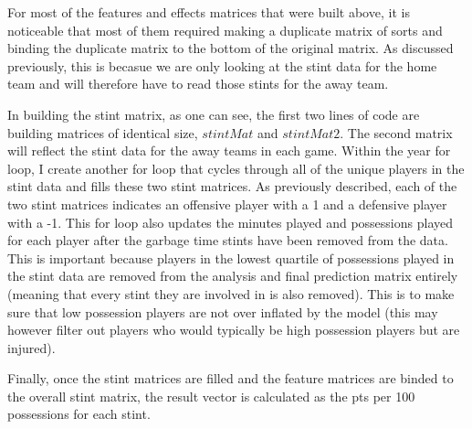 \documentclass[]{article}
\begin{document}
For most of the features and effects matrices that were built above, it
is noticeable that most of them required making a duplicate matrix of
sorts and binding the duplicate matrix to the bottom of the original
matrix. As discussed previously, this is becasue we are only looking at
the stint data for the home team and will therefore have to read those
stints for the away team.

In building the stint matrix, as one can see, the first two lines of
code are building matrices of identical size, \(stintMat\) and
\(stintMat2\). The second matrix will reflect the stint data for the
away teams in each game. Within the year for loop, I create another for
loop that cycles through all of the unique players in the stint data and
fills these two stint matrices. As previously described, each of the two
stint matrices indicates an offensive player with a 1 and a defensive
player with a -1. This for loop also updates the minutes played and
possessions played for each player after the garbage time stints have
been removed from the data. This is important because players in the
lowest quartile of possessions played in the stint data are removed from
the analysis and final prediction matrix entirely (meaning that every
stint they are involved in is also removed). This is to make sure that
low possession players are not over inflated by the model (this may
however filter out players who would typically be high possession
players but are injured).

Finally, once the stint matrices are filled and the feature matrices are
binded to the overall stint matrix, the result vector is calculated as
the pts per 100 possessions for each stint.
\end{document}
